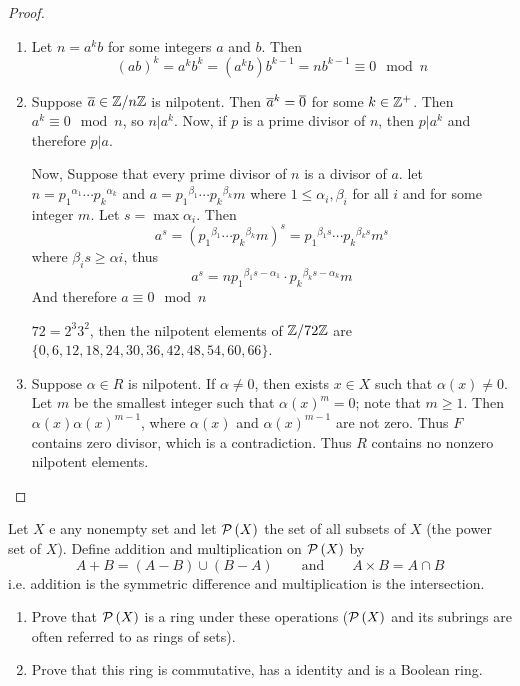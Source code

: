 \documentclass{amsart}
\begin{document}
\begin{proof} \,
    \begin{enumerate}
        \item Let $n = a^k b$ for some integers $a$ and $b$.
        Then $$ (ab)^k = a^k b^k = (a^k b) b^{k-1} = n b^{k-1} \equiv 0 \mod{n} $$
        
        \item Suppose $ \overline{a} \in \mathbb{Z} / n\mathbb{Z} $ is nilpotent. Then $ \overline{a}^k = \overline{0} $ for some $ k \in \mathbb{Z}^+ $. Then $a^k \equiv 0 \mod{n}$, so $n | a^k$. Now, if $p$ is a prime divisor of $n$, then $p | a^k$ and therefore $p | a$.
        
        Now, Suppose that every prime divisor of $n$ is a divisor of $a$. let $ n = {p_1}^{\alpha_1} \cdots {p_k}^{\alpha_k} $ and $ a = {p_1}^{\beta_1} \cdots {p_k}^{\beta_k} m$ where $1 \leq \alpha_i, \beta_i$ for all $i$ and for some integer $m$. Let $s = \max{\alpha_i}$. Then
        $$ a^s = \left( {p_1}^{\beta_1} \cdots {p_k}^{\beta_k} m \right)^s = {p_1}^{\beta_1 s} \cdots {p_k}^{\beta_k s} m^s$$
        where $\beta_i s \geq \alpha i$, thus
        $$ a^s = n {p_1}^{\beta_1 s - \alpha_1} \cdot {p_k}^{\beta_k s - \alpha_k} m$$
        And therefore $ a \equiv 0 \mod{n} $
        
        $ 72 = 2^3 3 ^2 $, then the nilpotent elements of $ \mathbb{Z} / 72\mathbb{Z} $ are  $\{ 0, 6, 12, 18, 24, 30, 36, 42, 48, 54, 60, 66 \}$.
        
        \item Suppose $ \alpha \in R $ is nilpotent. If $\alpha \neq 0$, then exists $ x \in X $ such that $ \alpha(x) \neq 0 $. Let $m$ be the smallest integer such that $ \alpha(x)^m = 0 $; note that $ m \geq 1 $. Then $ \alpha(x) {\alpha(x)}^{m-1} $, where $ \alpha(x) $ and $ {\alpha(x)}^{m-1} $ are not zero. Thus $F$ contains zero divisor, which is a contradiction. Thus $R$ contains no nonzero nilpotent elements.
    \end{enumerate}
\end{proof}

\begin{problem}[21]
    Let $X$ e any nonempty set and let $\mathcal{P}\left(X\right)$ the set of all subsets of $X$ (the power set of $X$). Define addition and multiplication on $\mathcal{P}\left(X\right)$ by
    $$ A + B = (A-B) \cup (B-A) \qquad \mbox{and} \qquad A \times B =  A \cap B $$
    i.e. addition is the symmetric difference and multiplication is the intersection.

    \begin{enumerate}
        \item Prove that $\mathcal{P}\left(X\right)$ is a ring under these operations ($\mathcal{P}\left(X\right)$ and its subrings are often referred to as rings of sets).
        \item Prove that this ring is commutative, has a identity and is a Boolean ring.
    \end{enumerate}
\end{problem}
\end{document}
